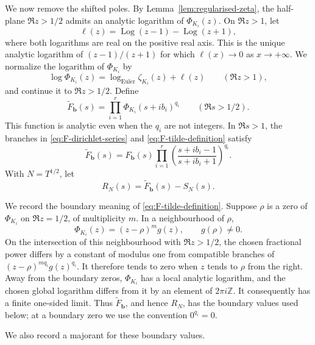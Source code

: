 \documentclass[11pt]{amsart}
\numberwithin{equation}{section}
\theoremstyle{plain}
\renewcommand{\tilde}{\widetilde}
\begin{document}
We now remove the shifted poles.  By Lemma~\ref{lem:regularised-zeta}, the
half-plane $\Re z>1/2$ admits an analytic logarithm of $\Phi_{K_i}(z)$.
On $\Re z>1$, let
\begin{equation*}
\ell(z)=\operatorname{Log}(z-1)-\operatorname{Log}(z+1),
\end{equation*}
where both logarithms are real on the positive real axis.  This is the
unique analytic logarithm of $(z-1)/(z+1)$ for which
$\ell(x)\to0$ as $x\to+\infty$.  We normalize the logarithm of
$\Phi_{K_i}$ by
\begin{equation*}
\log\Phi_{K_i}(z)=\log_{\mathrm{Euler}}\zeta_{K_i}(z)+\ell(z)
\qquad(\Re z>1),
\end{equation*}
and continue it to $\Re z>1/2$.  Define
\begin{equation}\label{eq:F-tilde-definition}
\tilde F_{\mathbf b}(s)=
\prod_{i=1}^r\Phi_{K_i}(s+ib_i)^{q_i}
\qquad(\Re s>1/2).
\end{equation}
This function is analytic even when the $q_i$ are not integers.  In
$\Re s>1$, the branches in \eqref{eq:F-dirichlet-series} and
\eqref{eq:F-tilde-definition} satisfy
\begin{equation}\label{eq:regularisation-identity}
\tilde F_{\mathbf b}(s)=F_{\mathbf b}(s)
\prod_{i=1}^r
\left(\frac{s+ib_i-1}{s+ib_i+1}\right)^{q_i}.
\end{equation}
With $N=T^{1/2}$, let
\begin{equation*}
R_N(s)=\tilde F_{\mathbf b}(s)-S_N(s).
\end{equation*}

We record the boundary meaning of \eqref{eq:F-tilde-definition}.  Suppose
$\rho$ is a zero of $\Phi_{K_i}$ on $\Re z=1/2$, of multiplicity $m$.
In a neighbourhood of $\rho$,
\begin{equation*}
\Phi_{K_i}(z)=(z-\rho)^m g(z),\qquad g(\rho)\ne0.
\end{equation*}
On the intersection of this neighbourhood with $\Re z>1/2$, the chosen
fractional power differs by a constant of modulus one from compatible
branches of $(z-\rho)^{m q_i}g(z)^{q_i}$.  It therefore tends to zero when
$z$ tends to $\rho$ from the right.  Away from the
boundary zeros, $\Phi_{K_i}$ has a local analytic logarithm, and the chosen
global logarithm differs from it by an element of $2\pi i\mathbb Z$.
It consequently has a finite one-sided limit.  Thus
$\tilde F_{\mathbf b}$, and hence $R_N$, has the boundary values used
below; at a boundary zero we use the convention $0^{q_i}=0$.

We also record a majorant for these boundary values.
\end{document}
